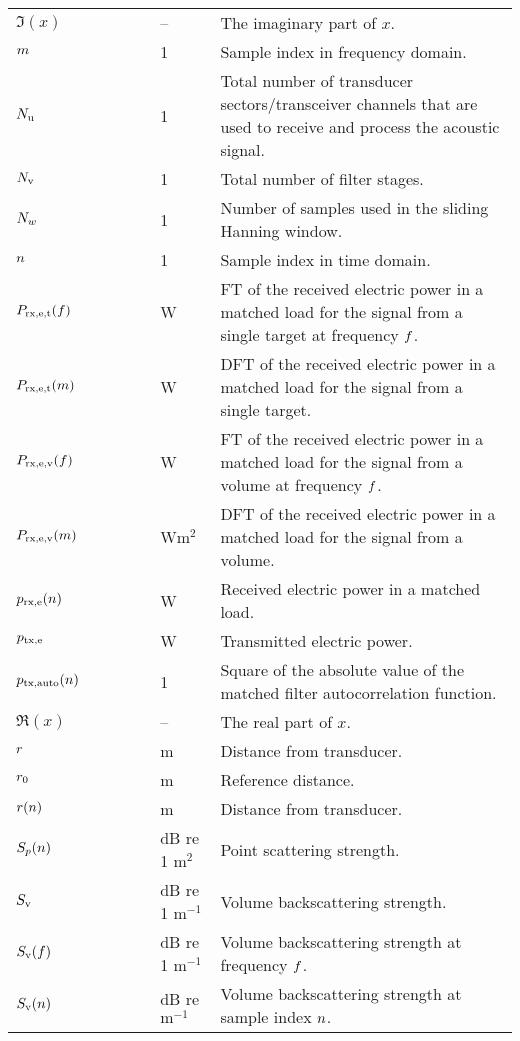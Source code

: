 \documentclass[12pt,a4paper]{article}
\begin{document}
\begin{longtable}{p{0.15\linewidth} p{0.13\linewidth} p{0.12\linewidth} p{0.6\linewidth} }
$\Im(x)$ & & -- & The imaginary part of $x$.\\

$m$ & & 1 & Sample index in frequency domain.\\

$N_{\textrm{u}}$ & & 1 & Total number of transducer sectors/transceiver channels that are used to receive and process the acoustic signal.\\
$N_{\textrm{v}}$ & & 1 & Total number of filter stages.\\
$N_{w}$ & & 1 & Number of samples used in the sliding Hanning window.\\
$n$ & & 1 & Sample index in time domain.\\

$P_{\textrm{rx,e,t}}(f)$ & & W & FT of the received electric power in a matched load for the signal from a single target at frequency $f$.\\
$P_{\textrm{rx,e,t}}(m)$ & & W & DFT of the received electric power in a matched load for the signal from a single target.\\
$P_{\textrm{rx,e,v}}(f)$ & & W & FT of the received electric power in a matched load for the signal from a volume at frequency $f$.\\
$P_{\textrm{rx,e,v}}(m)$ & & W$\textrm{m}^2$ & DFT of the received electric power in a matched load for the signal from a volume.\\
$p_{\textrm{rx,e}}(n)$  & & W & Received electric power in a matched load.\\

$p_{\textrm{tx,e}}$ & & W & Transmitted electric power.\\
$p_{\textrm{tx,auto}}(n)$ & & 1 & Square of the absolute value of the matched filter autocorrelation function.\\

$\Re(x)$ & & -- & The real part of $x$.\\
$r$ & & m & Distance from transducer.\\
$r_0$ & & m & Reference distance. \\
$r(n)$ & & m & Distance from transducer.\\

$S_p(n)$  & & dB re 1 $\textrm{m}^2$ & Point scattering strength.\\
$S_{\textrm{v}}$  & & dB re 1 $\textrm{m}^{-1}$ & Volume backscattering strength.\\
$S_{\textrm{v}}(f)$ & & dB re 1 $\textrm{m}^{-1}$ & Volume backscattering strength at frequency $f$.\\
$S_{\textrm{v}}(n)$ & & dB re $\textrm{m}^{-1}$ & Volume backscattering strength at sample index $n$.\\


\end{longtable}
\end{document}
